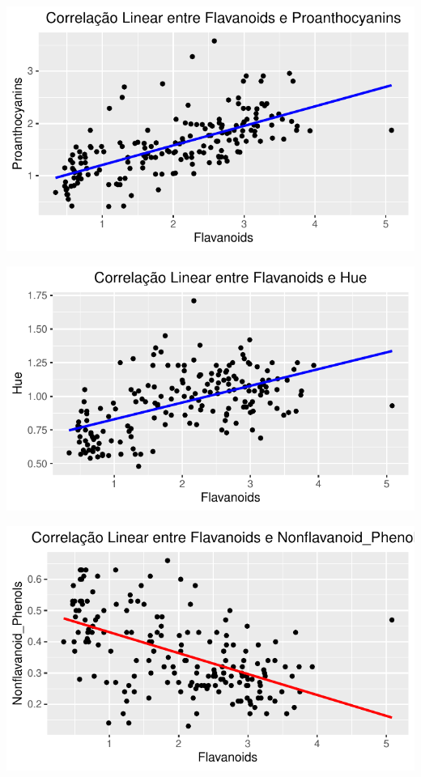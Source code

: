 \documentclass[
  letterpaper,
  DIV=11,
  numbers=noendperiod]{scrartcl}
\begin{document}
\begin{center}
\includegraphics{wines_analysis_files/figure-pdf/unnamed-chunk-11-3.pdf}
\end{center}

\begin{center}
\includegraphics{wines_analysis_files/figure-pdf/unnamed-chunk-11-4.pdf}
\end{center}

\begin{center}
\includegraphics{wines_analysis_files/figure-pdf/unnamed-chunk-11-5.pdf}
\end{center}
\end{document}
